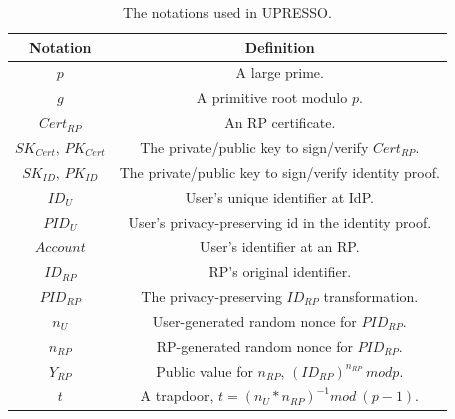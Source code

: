 



\begin{table}[tb]
    \caption{The notations used in UPRESSO.}
    \centering
    \begin{tabular}{|c|c|}
    \hline
    {Notation} & {Definition} \\
    \hline
    {$p$} & {A large prime.} \\
    \hline
    {$g$} & {A primitive root  modulo $p$.} \\
    \hline
    {$Cert_{RP}$} & {An RP certificate.} \\
    \hline
    {$SK_{Cert}$, $PK_{Cert}$} & {The private/public key to sign/verify $Cert_{RP}$.} \\
    \hline
    {$SK_{ID}$, $PK_{ID}$} & {The private/public key to sign/verify identity proof.} \\
    \hline
    {$ID_U$} & {User's unique identifier at IdP.} \\
    \hline
    {$PID_U$} & {User's privacy-preserving id in the identity proof.} \\
    \hline
    {$Account$} & {User's identifier at an RP.} \\
    \hline
    {$ID_{RP}$} & {RP's original identifier.} \\
    \hline
    {$PID_{RP}$} & {The privacy-preserving $ID_{RP}$ transformation.} \\
    \hline
    {$n_U$} & {User-generated random nonce for $PID_{RP}$. } \\
    \hline
    {$n_{RP}$} & {RP-generated random nonce for $PID_{RP}$. } \\
    \hline
    {$Y_{RP}$} & {Public value for $n_{RP}$, $(ID_{RP})^{n_{RP}} \ mod p$. } \\
    \hline
    {$t$} & {A trapdoor, $t=(n_U*n_{RP})^{-1} mod \ (p-1)$. } \\
    \hline
    \end{tabular}
    \label{tbl:notations}
\end{table}

